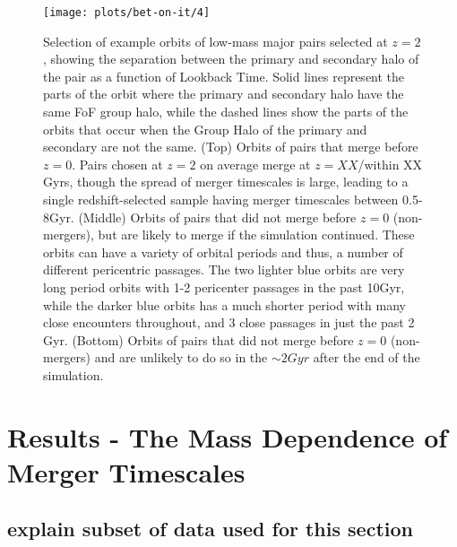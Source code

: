 \documentclass[twocolumn]{aastex631}
\begin{document}
\begin{figure}[htb]
    \centering
    \texttt{[image: plots/bet-on-it/4]}
    \caption{Selection of example orbits of low-mass major pairs selected at $z=2$, showing the separation between the primary and secondary halo of the pair as a function of Lookback Time.
    Solid lines represent the parts of the orbit where the primary and secondary halo have the same FoF group halo, while the dashed lines show the parts of the orbits that occur when the Group Halo of the primary and secondary are not the same. 
    (Top) Orbits of pairs that merge before $z=0$. Pairs chosen at $z=2$ on average merge at $z=XX$/within XX Gyrs, though the spread of merger timescales is large, leading to a single redshift-selected sample having merger timescales between 0.5-8Gyr. 
    (Middle) Orbits of pairs that did not merge before $z=0$ (non-mergers), but are likely to merge if the simulation continued. These orbits can have a variety of orbital periods and thus, a number of different pericentric passages. The two lighter blue orbits are very long period orbits with 1-2 pericenter passages in the past 10Gyr, while the darker blue orbits has a much shorter period with many close encounters throughout, and 3 close passages in just the past 2 Gyr. 
    (Bottom) Orbits of pairs that did not merge before $z=0$ (non-mergers) and are unlikely to do so in the $\sim2Gyr$ after the end of the simulation. 
    }
    \label{fig:example-orbits}
\end{figure}




\section{Results - The Mass Dependence of Merger Timescales}
\subsection{explain subset of data used for this section}
\end{document}
